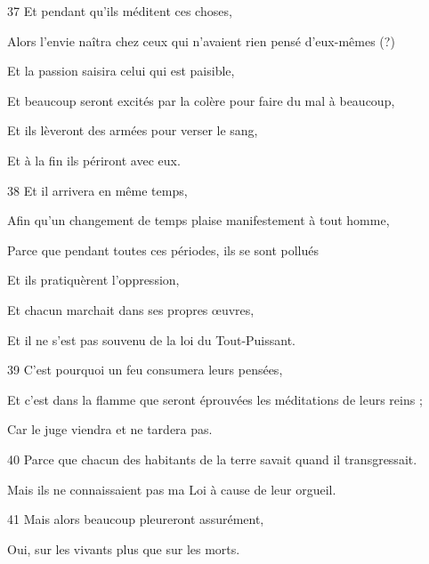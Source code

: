 \par 37 Et pendant qu'ils méditent ces choses,

\par Alors l'envie naîtra chez ceux qui n'avaient rien pensé d'eux-mêmes (?)

\par Et la passion saisira celui qui est paisible,

\par Et beaucoup seront excités par la colère pour faire du mal à beaucoup,

\par Et ils lèveront des armées pour verser le sang,

\par Et à la fin ils périront avec eux.

\par 38 Et il arrivera en même temps,

\par Afin qu'un changement de temps plaise manifestement à tout homme,

\par Parce que pendant toutes ces périodes, ils se sont pollués

\par Et ils pratiquèrent l'oppression,

\par Et chacun marchait dans ses propres œuvres,

\par Et il ne s'est pas souvenu de la loi du Tout-Puissant.

\par 39 C'est pourquoi un feu consumera leurs pensées,

\par Et c'est dans la flamme que seront éprouvées les méditations de leurs reins ;

\par Car le juge viendra et ne tardera pas.

\par 40 Parce que chacun des habitants de la terre savait quand il transgressait.

\par Mais ils ne connaissaient pas ma Loi à cause de leur orgueil.

\par 41 Mais alors beaucoup pleureront assurément,

\par Oui, sur les vivants plus que sur les morts.

